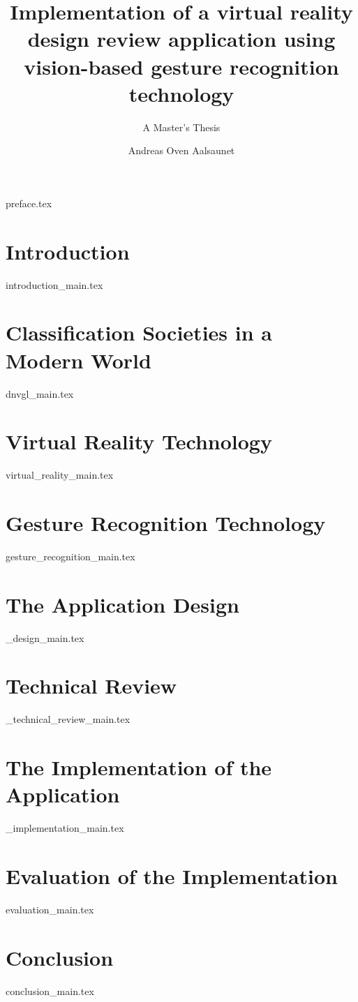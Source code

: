 \documentclass[UKenglish]{ifimaster}
\title{Implementation of a virtual reality design review application using vision-based gesture recognition technology}
\subtitle{A Master's Thesis}
\author{Andreas Oven Aalsaunet}
\begin{document}
\duoforside[dept={Department of Informatics}, program={Programming and Networks}, long]                                        

{preface.tex}

\frontmatter{}                 
\tableofcontents{}
\listoffigures{}
\listoftables{}

\mainmatter{}
  
\chapter{Introduction}  
\label{chapter:introduction}
{introduction_main.tex}

\chapter{Classification Societies in a Modern World}
\label{chapter:dnvgl}
{dnvgl_main.tex}

\chapter{Virtual Reality Technology}
\label{chapter:vr}
{virtual_reality_main.tex}

\chapter{Gesture Recognition Technology}
\label{chapter:grt}
{gesture_recognition_main.tex}

\chapter{The Application Design}
\label{chapter:design}
{_design_main.tex}

\chapter{Technical Review}
\label{chapter:technical}
{_technical_review_main.tex}

\chapter{The Implementation of the Application}
\label{chapter:implementation}
{_implementation_main.tex}

\chapter{Evaluation of the Implementation}
\label{chapter:evaluation}
{evaluation_main.tex}

\chapter{Conclusion}
\label{chapter:conclusion}
{conclusion_main.tex}

\backmatter{}


\end{document}
